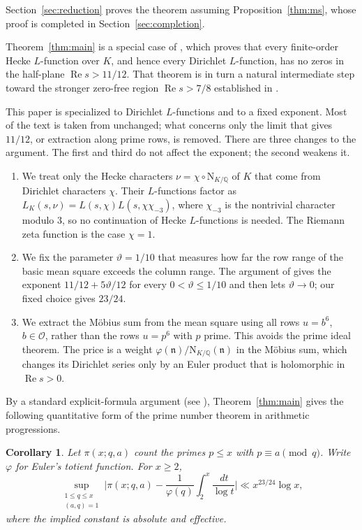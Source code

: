 \documentclass[11pt,a4paper]{article}
\numberwithin{equation}{section}
\numberwithin{figure}{section}
\newtheorem{corollary}[theorem]{Corollary}
\theoremstyle{definition}
\theoremstyle{remark}
\newcommand{\Q}{\mathbb Q}
\newcommand{\NK}{\mathrm N_{K/\Q}}
\newcommand{\OO}{\mathcal O}
\newcommand{\Rea}{\operatorname{Re}}
\newcommand{\dd}{\,d}
\begin{document}
Section~\ref{sec:reduction} proves the theorem assuming
Proposition~\ref{thm:ms}, whose proof is completed in
Section~\ref{sec:completion}.

Theorem~\ref{thm:main} is a special case of \cite[Theorem~1.1]{OpenAI26b}, which proves that every finite-order Hecke $L$-function over $K$, and hence every Dirichlet $L$-function, has no zeros in the half-plane $\Rea s>11/12$. That theorem is in turn a natural intermediate step toward the stronger zero-free region $\Rea s>7/8$ established in \cite[Theorem~1.1]{OpenAI26}.

This paper is \cite{OpenAI26b} specialized to Dirichlet $L$-functions and to a fixed exponent. Most of the text is taken from \cite{OpenAI26b} unchanged; what concerns only the limit that gives $11/12$, or extraction along prime rows, is removed. There are three changes to the argument. The first and third do not affect the exponent; the second weakens it.
\begin{enumerate}
\item We treat only the Hecke characters $\nu=\chi\circ\NK$ of $K$ that come from Dirichlet characters $\chi$. Their $L$-functions factor as $L_K(s,\nu)=L(s,\chi)L(s,\chi\chi_{-3})$, where $\chi_{-3}$ is the nontrivial character modulo $3$, so no continuation of Hecke $L$-functions is needed. The Riemann zeta function is the case $\chi=1$.
\item We fix the parameter $\vartheta=1/10$ that measures how far the row range of the basic mean square exceeds the column range. The argument of \cite{OpenAI26b} gives the exponent $11/12+5\vartheta/12$ for every $0<\vartheta\le1/10$ and then lets $\vartheta\to0$; our fixed choice gives $23/24$.
\item We extract the M\"obius sum from the mean square using all rows $u=b^6$, $b\in\OO$, rather than the rows $u=p^6$ with $p$ prime. This avoids the prime ideal theorem. The price is a weight $\varphi(\mathfrak n)/\NK(\mathfrak n)$ in the M\"obius sum, which changes its Dirichlet series only by an Euler product that is holomorphic in $\Rea s>0$.
\end{enumerate}

By a standard explicit-formula argument (see \cite[Chapters~19--20]{Dav00}), Theorem~\ref{thm:main} gives the following quantitative form of the prime number theorem in arithmetic progressions.

\begin{corollary}\label{cor:primes-ap}
Let $\pi(x;q,a)$ count the primes $p\le x$ with $p\equiv a\pmod q$.
Write $\varphi$ for Euler's totient function.
For $x\ge2$,
\[
 \sup_{\substack{1\le q\le x\\(a,q)=1}}
 \biggl|\pi(x;q,a)-\frac1{\varphi(q)}
                  \int_2^x\frac{\dd t}{\log t}\biggr|
 \ll x^{23/24}\log x,
\]
where the implied constant is absolute and effective.
\end{corollary}
\end{document}
